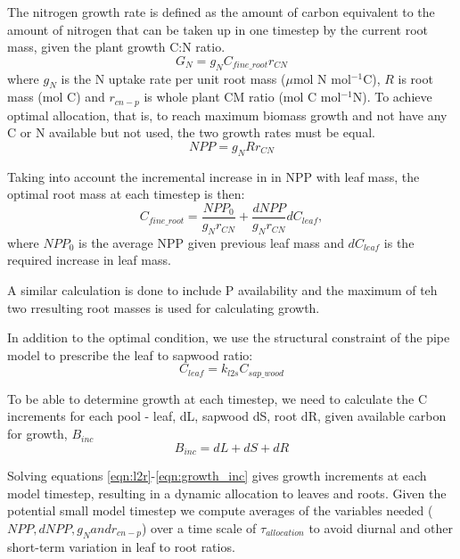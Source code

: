 The nitrogen growth rate is defined as the amount of carbon equivalent to the amount of nitrogen that can be taken up in one timestep by the current root mass, given the plant growth C:N ratio.
\begin{equation}
 G_N=g_NC_{fine\_root}r_{CN}
\end{equation}
where $g_N$ is the N uptake rate per unit root mass ($\mu$mol N mol$^{-1}$C), $R$ is root mass (mol C) and $r_{cn-p}$ is whole plant CM ratio (mol C mol$^{-1}$N). To achieve optimal allocation, that is, to reach maximum biomass growth and not have any C or N available but not used, the two growth rates must be equal.
\begin{equation}\label{eqn:l2r}
 NPP=g_NRr_{CN}
\end{equation}

Taking into account the incremental increase in in NPP with leaf mass, the optimal root mass at each timestep is then:
\begin{equation}
 C_{fine\_root}=\frac{NPP_0}{g_Nr_{CN}}+\frac{dNPP}{g_Nr_{CN}}dC_{leaf},
\end{equation}
where $NPP_0$ is the average NPP given previous leaf mass and $dC_{leaf}$ is the required increase in leaf mass.

A similar calculation is done to include P availability and the maximum of teh two rresulting root masses is used for calculating growth.

In addition to the optimal condition, we use the structural constraint of the pipe model to prescribe the leaf to sapwood ratio:
\begin{equation}\label{eqn:l2s}
 C_{leaf} = k_{l2s} C_{sap\_wood}
\end{equation}

To be able to determine growth at each timestep, we need to calculate the C increments for each pool - leaf, dL, sapwood dS, root dR, given available carbon for growth, $B_{inc}$
\begin{equation}\label{eqn:growth_inc}
 B_{inc}=dL+dS+dR
\end{equation}

Solving equations \ref{eqn:l2r}-\ref{eqn:growth_inc} gives growth increments at each model timestep, resulting in a dynamic allocation to leaves and roots. Given the potential small model timestep we compute averages of the variables needed ($NPP, dNPP, g_N and r_{cn-p}$) over a time scale of $\tau_{allocation}$ to avoid diurnal and other short-term variation in leaf to root ratios.

